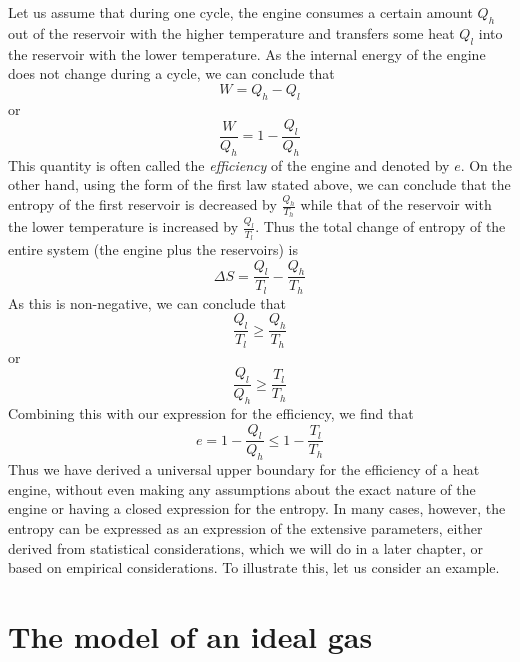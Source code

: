 \documentclass[a4paper, draft]{article}
\theoremstyle{own}
\theoremstyle{remark}
\begin{document}
Let us assume that during one cycle, the engine consumes a certain amount $Q_h$ out of the reservoir with the higher temperature and transfers some heat $Q_l$ into the reservoir with the lower temperature. As the internal energy of the engine does not change during a cycle, we can conclude that
$$
W = Q_h - Q_l
$$
or 
$$
\frac{W}{Q_h} = 1 - \frac{Q_l}{Q_h}
$$
This quantity is often called the {\em efficiency} of the engine and denoted by $e$. On the other hand, using the form of the first law stated above, we can conclude that the entropy of the first reservoir is decreased by $\frac{Q_h}{T_h}$ while that of the reservoir with the lower temperature is increased by $\frac{Q_l}{T_l}$.
Thus the total change of entropy of the entire system (the engine plus the reservoirs) is
$$
\Delta S = \frac{Q_l}{T_l} - \frac{Q_h}{T_h}
$$
As this is non-negative, we can conclude that
$$
\frac{Q_l}{T_l} \geq \frac{Q_h}{T_h}
$$
or
$$
\frac{Q_l}{Q_h} \geq \frac{T_l}{T_h}
$$
Combining this with our expression for the efficiency, we find that
$$
e = 1 - \frac{Q_l}{Q_h} \leq 1 - \frac{T_l}{T_h}
$$
Thus we have derived a universal upper boundary for the efficiency of a heat engine, without even making any assumptions about the exact nature of the engine or having a closed expression for the entropy. In many cases, however, the entropy can be expressed as an expression of the extensive parameters, either derived from statistical considerations, which we will do in a later chapter, or based on empirical considerations. To illustrate this, let us consider an example.

\section{The model of an ideal gas}
\end{document}
